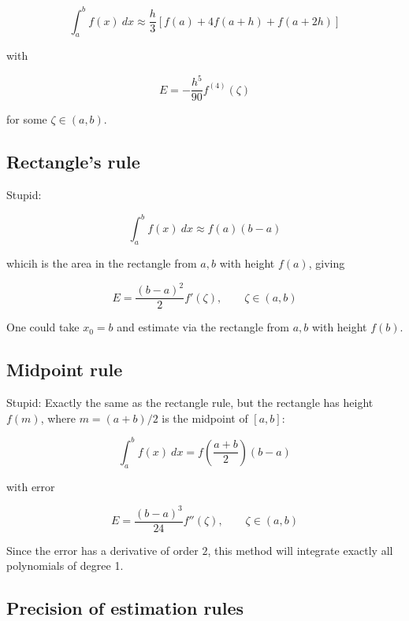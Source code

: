 \documentclass[12pt]{article}
\theoremstyle{definition}
\begin{document}
\begin{equation*}
    \int_a^b f(x) ~ dx \approx \frac{h}{3}\left[ f(a) + 4f\left( a + h \right) +
    f(a + 2h)\right] 
\end{equation*}

with 

\begin{equation*}
    E = -\frac{h^5}{90} f^{(4)}(\zeta)
\end{equation*}

for some $\zeta \in (a, b)$.

\subsection{Rectangle's rule}

Stupid: 

\begin{equation*}
    \int_a^b f(x) ~ dx \approx f(a)(b-a)
\end{equation*}

whicih is the area in the rectangle from $a, b$ with height $f(a)$, giving 

\begin{equation*}
    E = \frac{(b-a)^2}{2}f'(\zeta), \qquad \zeta\in (a, b)
\end{equation*}

One could take $x_0 = b$ and estimate via the rectangle from $a, b$ with height
$f(b)$.


\subsection{Midpoint rule}

Stupid: Exactly the same as the rectangle rule, but the rectangle has height
$f(m)$, where $m = (a+b) / 2$ is the midpoint of $[a, b]$: 

\begin{equation*}
    \int_a^b f(x) ~ dx = f\left( \frac{a+b}{2} \right) (b-a)
\end{equation*}

with error 

\begin{equation*}
    E = \frac{(b-a)^3}{24} f''(\zeta), \qquad \zeta \in (a, b)
\end{equation*}

Since the error has a derivative of order $2$, this method will integrate
exactly all polynomials of degree 1.

\subsection{Precision of estimation rules}
\end{document}
